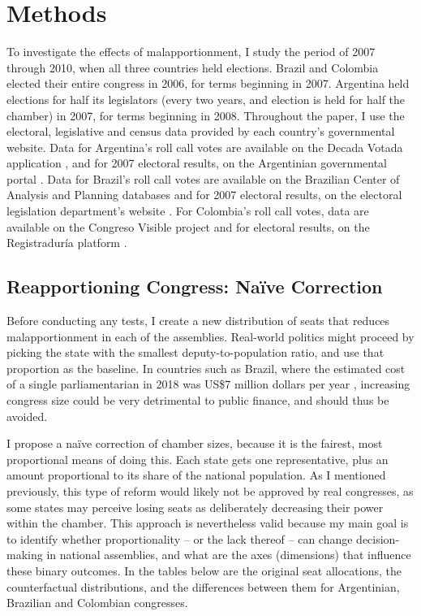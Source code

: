 \documentclass[a4paper,12pt]{article}
\begin{document}
\section{Methods}
\label{sec:methods}

To investigate the effects of malapportionment, I study the period of 2007 through 2010, when all three countries held elections. Brazil and Colombia elected their entire congress in 2006, for terms beginning in 2007. Argentina held elections for half its legislators (every two years, and election is held for half the chamber) in 2007, for terms beginning in 2008. Throughout the paper, I use the electoral, legislative and census data provided by each country's governmental website. Data for Argentina's roll call votes are available on the Decada Votada application \citep{decadavotada}, and for 2007 electoral results, on the Argentinian governmental portal \citep{elecarg}. Data for Brazil's roll call votes are available on the Brazilian Center of Analysis and Planning databases \citep{cebrap} and for 2007 electoral results, on the electoral legislation department's website \citep{elecbra}. For Colombia's roll call votes, data are available on the Congreso Visible project \citep{congresovisible} and for electoral results, on the Registraduría platform \citep{eleccol}.

\subsection{Reapportioning Congress: Naïve Correction}
\label{sub:naive}

Before conducting any tests, I create a new distribution of seats that reduces malapportionment in each of the assemblies. Real-world politics might proceed by picking the state with the smallest deputy-to-population ratio, and use that proportion as the baseline. In countries such as Brazil, where the estimated cost of a single parliamentarian in 2018 was US\$7 million dollars per year \citep{interparliamentary2018congresso}, increasing congress size could be very detrimental to public finance, and should thus be avoided. 

I propose a naïve correction of chamber sizes, because it is the fairest, most proportional means of doing this. Each state gets one representative, plus an amount proportional to its share of the national population. As I mentioned previously, this type of reform would likely not be approved by real congresses, as some states may perceive losing seats as deliberately decreasing their power within the chamber. This approach is nevertheless valid because my main goal is to identify whether proportionality -- or the lack thereof -- can change decision-making in national assemblies, and what are the axes (dimensions) that influence these binary outcomes. In the tables below are the original seat allocations, the counterfactual distributions, and the differences between them for Argentinian, Brazilian and Colombian congresses. 
\end{document}
